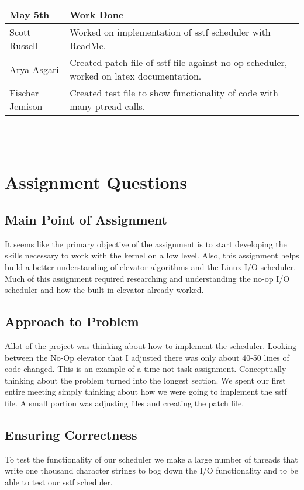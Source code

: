 \documentclass[onecolumn, draftclsnofoot,10pt, compsoc]{IEEEtran}
\begin{document}
\vspace{.1in}
\noindent
\begin{tabular} {| p{2.5cm} | p{8.4cm}|}

\hline
\textbf{May 5th} & \textbf{Work Done} \\
\hline 
Scott Russell & Worked on implementation of sstf scheduler with ReadMe.  \\

\hline 
\hline 
Arya Asgari & Created patch file of sstf file against no-op scheduler, worked on latex documentation.\\

\hline 
\hline 
Fischer Jemison & Created test file to show functionality of code with many ptread calls. \\

\hline 
\end {tabular}
\\ \\

\section{Assignment Questions}
\subsection{Main Point of Assignment}
It seems like the primary objective of the assignment is to start developing the skills necessary to work with the kernel on a low level. Also, this assignment helps build a better understanding of elevator algorithms and the Linux I/O scheduler. Much of this assignment required researching and understanding the no-op I/O scheduler and how the built in elevator already worked. 
\subsection{Approach to Problem}
Allot of the project was thinking about how to implement the scheduler. Looking between the No-Op elevator that I adjusted there was only about 40-50 lines of code changed. This is an example of a time not task assignment. Conceptually thinking about the problem turned into the longest section. We spent our first entire meeting simply thinking about how we were going to implement the sstf file. A small portion was adjusting files and creating the patch file.
\subsection{Ensuring Correctness}
To test the functionality of our scheduler we make a large number of threads that write one thousand character strings to bog down the I/O functionality and to be able to test our sstf scheduler.
\end{document}
